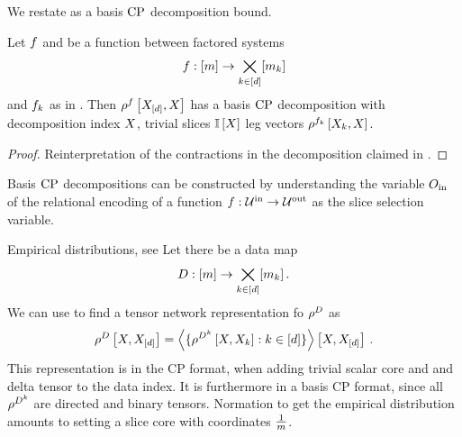 
We restate  as a basis $\mathrm{CP}$ decomposition bound.

\begin{theorem}
    \label{the:functionDecompositionBasisCP}
    Let $f$ and be a function between factored systems
    \begin{align*}
        f : [m] \rightarrow  \bigtimes_{k\in[d]}[m_{k}]
    \end{align*}
    and $f_{k}$ as in .
    Then $\rho^{f}\left[X_{[d]},X\right]$ has a basis $\mathrm{CP}$ decomposition with decomposition index $X$, trivial slices $\mathbb{I}\left[X\right]$ leg vectors $\rho^{f_{k}}\left[X_{k},X\right]$.
\end{theorem}
\begin{proof}
    Reinterpretation of the contractions in the decomposition claimed in .
\end{proof}

Basis $\mathrm{CP}$ decompositions can be constructed by understanding the variable $O_{\mathrm{in}}$ of the relational encoding of a function $f:\mathcal{U}^{\mathrm{in}} \rightarrow \mathcal{U}^{\mathrm{out}}$ as the slice selection variable.

\begin{example}{Empirical distributions, see }
    \label{exa:empDistCP}
    Let there be a data map
    \[ D : [m] \rightarrow \bigtimes_{k\in[d]}[m_{k}] \, . \]
    We can use  to find a tensor network representation fo $\rho^{D}$ as
    \begin{align*}
        \rho^{D}\left[X,X_{[d]}\right]
        = \left\langle 
            \{\rho^{D^{k}}\left[X,X_{k}\right] : k\in[d] \}
        \right\rangle \left[ X,X_{[d]} \right] \, .
    \end{align*}
    This representation is in the CP format, when adding trivial scalar core and and delta tensor to the data index.
    It is furthermore in a basis CP format, since all $\rho^{D^{k}}$ are directed and binary tensors.
    Normation to get the empirical distribution amounts to setting a slice core with coordinates $\frac{1}{m}$.
\end{example}

